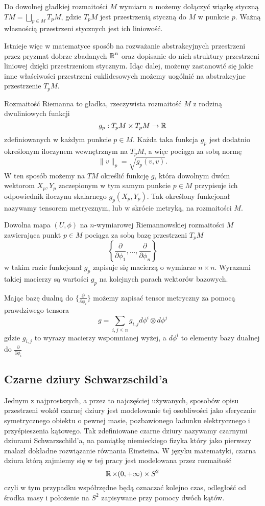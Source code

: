 Do dowolnej gładkiej rozmaitości $M$ wymiaru $n$ możemy dołączyć wiązkę styczną $TM=\bigsqcup_{p\in M}T_pM$, gdzie $T_pM$ jest przestrzenią styczną do $M$ w punkcie $p$. Ważną własnością przestrzeni stycznych jest ich liniowość.

Istnieje więc w matematyce sposób na rozważanie abstrakcyjnych przestrzeni przez pryzmat dobrze zbadanych $\operatorname{\mathbb{R}}^n$ oraz dopisanie do nich struktury przestrzeni liniowej dzięki przestrzeniom stycznym. Idąc dalej, możemy zastanowić się jakie inne właściwości przestrzeni euklidesowych możemy uogólnić na abstrakcyjne przestrzenie $T_pM$.

Rozmaitość Riemanna to gładka, rzeczywista rozmaitość $M$ z rodziną dwuliniowych funkcji 
$$g_p:T_pM\times T_pM\to \operatorname{\mathbb{R}}$$ 
zdefiniowanych w każdym punkcie $p\in M$. Każda taka funkcja $g_p$ jest dodatnio określonym iloczynem wewnętrznym na $T_pM$, a więc pociąga za sobą normę 
$$\|v\|_p=\sqrt{g_p(v, v)}.$$
W ten sposób możemy na $TM$ określić funkcję $g$, która dowolnym dwóm wektorom $X_p,Y_p$ zaczepionym w tym samym punkcie $p\in M$ przypisuje ich odpowiednik iloczynu skalarnego $g_p(X_p,Y_p)$. Tak określony funkcjonał nazywamy tensorem metrycznym, lub w skrócie metryką, na rozmaitości $M$.

Dowolna mapa $(U,\phi)$ na $n$-wymiarowej Riemannowskiej rozmaitości $M$ zawierająca punkt $p\in M$ pociąga za sobą bazę przestrzeni $T_pM$
$$\left\{ \frac{\partial}{\partial\phi_1} , ... , \frac{\partial}{\partial\phi_n} \right\}$$
w takim razie funkcjonał $g_p$ zapisuje się macierzą o wymiarze $n\times n$. Wyrazami takiej macierzy są wartości $g_p$ na kolejnych parach wektorów bazowych.

Mając bazę dualną do $\{\frac{\partial}{\partial\phi_i}\}$ możemy zapisać tensor metryczny za pomocą prawdziwego tensora
$$g=\sum_{i,j\leq n}g_{i,j}d\phi^i\otimes d\phi^j$$
gdzie $g_{i,j}$ to wyrazy macierzy wspomnianej wyżej, a $d\phi^i$ to elementy bazy dualnej do $\frac{\partial}{\partial\phi_i}$


\subsection{Czarne dziury Schwarzschild'a}

Jednym z najprostszych, a przez to najczęściej używanych, sposobów opisu przestrzeni wokół czarnej dziury jest modelowanie tej osobliwości jako sferycznie symetrycznego obiektu o pewnej masie, pozbawionego ładunku elektrycznego i przyśpieszenia kątowego. Tak zdefiniowane czarne dziury nazywamy czarnymi dziurami Schwarzschild'a, na pamiątkę niemieckiego fizyka który jako pierwszy znalazł dokładne rozwiązanie równania Einsteina. W języku matematyki, czarna dziura którą zajmiemy się w tej pracy jest modelowana przez rozmaitość
$$\operatorname{\mathbb{R}}\times(0, +\infty)\times S^2$$
czyli w tym przypadku współrzędne będą oznaczać kolejno czas, odległość od środka masy i położenie na $S^2$ zapisywane przy pomocy dwóch kątów.

